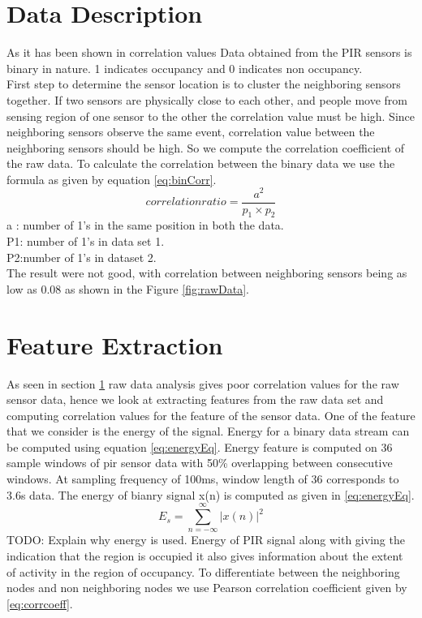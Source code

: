 \section{Data Description}
\label{sec:rawData}
As it has been shown in \cite{Hong:2013:TAS:2528282.2528302} correlation values 
Data obtained from the PIR sensors is binary in nature. 1 indicates occupancy and 0 indicates non occupancy. \\
First step to determine the sensor location is to cluster the neighboring sensors together. If two sensors are physically close to each other, and people move from sensing region of one sensor to the other the correlation value must be high.
Since neighboring sensors observe the same event, correlation value between the neighboring sensors should be high. So we compute the correlation coefficient of the raw data. To calculate the correlation between the binary data we use  the formula as given by equation \ref{eq:binCorr}.
\begin{equation}
\label{eq:binCorr}
correlation ratio = \frac{a^2}{p_1\times p_2}
\end{equation}
a : number of 1’s in the same position in both the data.\\
P1: number of 1’s in data set 1.\\
P2:number of 1’s in dataset 2.\\
The result were not good, with correlation between neighboring sensors being as low as 0.08 as shown in the Figure \ref{fig:rawData}.


\section{Feature Extraction}
\label{ref:feature}
As seen in section \ref{sec:rawData} raw data analysis gives poor correlation values for the raw sensor data, hence we look at extracting features from the raw data set and computing correlation values for the feature of the sensor data. One of the feature that we consider is the energy of the signal. Energy for a binary data stream can be computed using equation \ref{eq:energyEq}.
Energy feature is computed on 36 sample windows of pir sensor data with 50\% overlapping between consecutive windows. At sampling frequency of 100ms, window length of 36 corresponds to 3.6s data.
The energy of bianry signal x(n) is computed as given in \ref{eq:energyEq}.\\
\begin{equation}
\label{eq:energyEq}
E_s = {\sum_{n=-\infty}^{\infty}{|x(n)|}^2}
\end{equation}
TODO: Explain why energy is used.
Energy of PIR signal along with giving the indication that the region is occupied it also gives information about the extent of activity in the region of occupancy. To differentiate between the neighboring nodes and non neighboring nodes we use Pearson correlation coefficient given by \ref{eq:corrcoeff}. 



